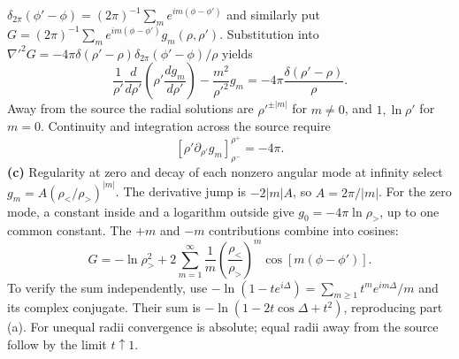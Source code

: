 $\delta_{2\pi}(\phi'-\phi)=(2\pi)^{-1}\sum_m e^{im(\phi-\phi')}$
and similarly put
$G=(2\pi)^{-1}\sum_m e^{im(\phi-\phi')}g_m(\rho,\rho')$.
Substitution into
$\nabla'^2G=-4\pi\delta(\rho'-\rho)\delta_{2\pi}(\phi'-\phi)/\rho$
yields
\[
\frac1{\rho'}\frac d{d\rho'}\left(\rho'\frac{dg_m}{d\rho'}\right)
 -\frac{m^2}{\rho'^2}g_m=-4\pi\frac{\delta(\rho'-\rho)}\rho.
\]
Away from the source the radial solutions are $\rho'^{\pm|m|}$
for $m\ne0$, and $1,\ln\rho'$ for $m=0$. Continuity and integration
across the source require
\[
[\rho'\partial_{\rho'}g_m]_{\rho^-}^{\rho^+}=-4\pi.
\]
\textbf{(c)} Regularity at zero and decay of each nonzero angular
mode at infinity select $g_m=A(\rho_</\rho_>)^{|m|}$.
The derivative jump is $-2|m|A$, so
$A=2\pi/|m|$. For the zero mode, a constant inside and a logarithm
outside give $g_0=-4\pi\ln\rho_>$, up to one common constant.
The $+m$ and $-m$ contributions combine into cosines:
\[
\boxed{G=-\ln\rho_>^2
 +2\sum_{m=1}^\infty\frac1m
       \left(\frac{\rho_<}{\rho_>}\right)^m
          \cos[m(\phi-\phi')].}
\]
To verify the sum independently, use
$-\ln(1-te^{i\Delta})=\sum_{m\geq1}t^me^{im\Delta}/m$ and
its complex conjugate. Their sum is
$-\ln(1-2t\cos\Delta+t^2)$, reproducing part (a).
For unequal radii convergence is absolute; equal radii away from
the source follow by the limit $t\uparrow1$.

